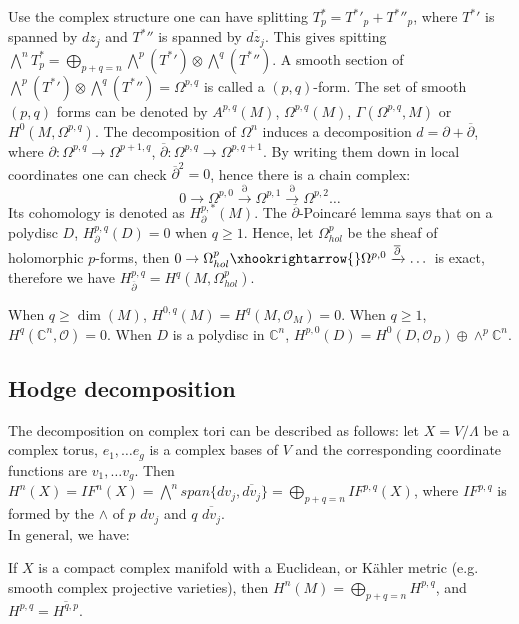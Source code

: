 Use the complex structure one can have splitting $T^*_p={T^*}'_p+{T^*}{''}_p$, where ${T^*}'$ is spanned by $dz_j$ and ${T^*}{''}$ is spanned by $\overline{dz_j}$. This gives spitting $\bigwedge^nT^*_p=\bigoplus_{p+q=n}\bigwedge^p({T^*}')\otimes \bigwedge^q({T^*}{''})$. A smooth section of $\bigwedge^p({T^*}')\otimes \bigwedge^q({T^*}{''})=\Omega^{p,q}$ is called a $(p,q)$-form. The set of smooth $(p,q)$ forms can be denoted by $A^{p,q}(M)$, $\Omega^{p,q}(M)$, $\Gamma(\Omega^{p,q},M)$ or $H^0(M,\Omega^{p,q})$. The decomposition of $\Omega^n$ induces a decomposition $d=\partial+\overline{\partial}$, where $\partial: \Omega^{p,q}\rightarrow\Omega^{p+1,q}$, $\overline{\partial}:\Omega^{p,q}\rightarrow\Omega^{p,q+1}$. By writing them down in local coordinates one can check $\overline{\partial}^2=0$, hence there is a chain complex:
$$0\rightarrow\Omega^{p,0}\xrightarrow{\partial}\Omega^{p,1}\xrightarrow{\partial}\Omega^{p,2}\dots$$
Its cohomology is denoted as $H^{p,*}_\partial(M)$. 
The $\overline{\partial}$-Poincar\'e lemma says that on a polydisc $D$, $H^{p,q}_\partial(D)=0$ when $q\geq 1$. Hence, let $\Omega^p_{hol}$ be the sheaf of holomorphic $p$-forms, then $0\rightarrow\Omega^p_{hol}\xhookrightarrow{}\Omega^{p,0}\xrightarrow{\overline{\partial}}\dots$ is exact, therefore we have $H^{p,q}_{\overline{\partial}}=H^q(M,\Omega^p_{hol})$. \\

\begin{example}
When $q\geq\dim(M)$, $H^{0,q}(M)=H^q(M,\mathcal{O}_M)=0$. When $q\geq 1$, $H^q(\mathbb{C}^n,\mathcal{O})=0$. When $D$ is a polydisc in $\mathbb{C}^n$, $H^{p,0}(D)=H^0(D,\mathcal{O}_D)\oplus\wedge^p\mathbb{C}^n$. 	
\end{example}

\subsection{Hodge decomposition}
The decomposition on complex tori can be described as follows: let $X=V/\Lambda$ be a complex torus, $e_1,\dots e_g$ is a complex bases of $V$ and the corresponding coordinate functions are $v_1,\dots v_g$. Then $H^n(X)=IF^n(X)=\bigwedge^n span\{dv_j,\overline{dv_j}\}=\bigoplus_{p+q=n}IF^{p,q}(X)$, where $IF^{p,q}$ is formed by the $\wedge$ of $p$ $dv_j$ and $q$ $\overline{dv_j}$.\\
 
In general, we have: 
\begin{theorem}
	If $X$ is a compact complex manifold with a Euclidean, or K\"ahler metric (e.g. smooth complex projective varieties), then $H^n(M)=\bigoplus_{p+q=n}H^{p,q}$, and $H^{p,q}=\overline{H^{q,p}}$.
\end{theorem}

	 